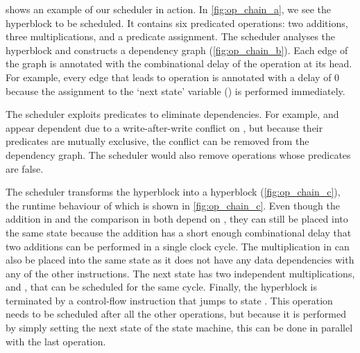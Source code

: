  shows an example of our scheduler in action. In
\cref{fig:op_chain_a}, we see the \rtlblock{} hyperblock to be scheduled. It
contains six predicated operations: two additions, three multiplications, and a
predicate assignment.
The scheduler analyses the hyperblock and constructs a dependency graph
(\cref{fig:op_chain_b}). Each edge of the graph is annotated with the
combinational delay of the operation at its head. For example, every edge that
leads to operation \sVII{}  is annotated with a delay of 0
because the assignment to the `next state' variable () is
performed immediately.

The scheduler exploits predicates to eliminate dependencies. For example,
\sIII{} and \sIV{} appear dependent due to a write-after-write conflict on
, but because their predicates are mutually exclusive, the
conflict can be removed from the dependency graph. The scheduler would also
remove operations whose predicates are false.


The scheduler transforms the \rtlblock{} hyperblock into a \rtlpar{} hyperblock
(\cref{fig:op_chain_c}), the runtime behaviour of which is shown in
\cref{fig:op_chain_c}. Even though the addition in \sII{} and the comparison in
\sVI{} both depend on \sI{}, they can still be placed into the same state
because the addition has a short enough combinational delay that two additions
can be performed in a single clock cycle.  The multiplication in \sIII{} can
also be placed into the same state as it does not have any data dependencies
with any of the other instructions.  The next state has two independent
multiplications, \sIV{} and \sV{}, that can be scheduled for the same
cycle. Finally, the hyperblock is terminated by a control-flow instruction that
jumps to state .  This operation needs to be scheduled after all
the other operations, but because it is performed by simply setting the next
state of the state machine, this can be done in parallel with the last
operation.

